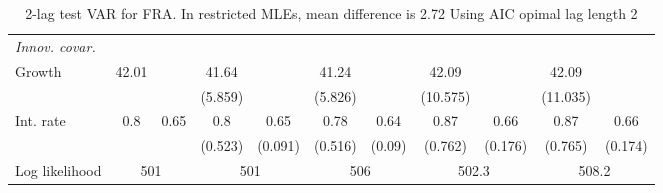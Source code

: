\begin{table}[htbp]
\begin{tabular}{@{\extracolsep{4pt}}lcccccccccc@{}}
\rule{0pt}{4ex} \emph{Innov. covar.}  	 & 	 & 	 & 	 & 	 & 	 & 	 & 	 & 	 & 	 &\\ 
\quad Growth 	 &42.01 	 &  	 & 41.64 	 &  	 & 41.24 	 &  	 & 42.09 	 &  	 & 42.09 	 & 	 \\ 
 		 &  	 &  	 & (5.859) 	 &  	 & (5.826) 	 &  	 & (10.575) 	 &  	 & (11.035) 	 &  	 \\ 
\quad Int. rate 	 &0.8 	 & 0.65 	 & 0.8 	 & 0.65 	 & 0.78 	 & 0.64 	 & 0.87 	 & 0.66 	 & 0.87 	 & 0.66	 \\ 
 		 &  	 &  	 & (0.523) 	 & (0.091) 	 & (0.516) 	 & (0.09) 	 & (0.762) 	 & (0.176) 	 & (0.765) 	 & (0.174) 	 \\ 
 \hline \rule{0pt}{4ex} 
  Log likelihood 	 &\multicolumn{2}{c}{501} 	 & \multicolumn{2}{c}{501} 	 & \multicolumn{2}{c}{506} 	 & \multicolumn{2}{c}{502.3} 	 & \multicolumn{2}{c}{508.2}\\ 

 \hline 	\end{tabular}		\caption{2-lag test VAR for FRA. In restricted MLEs, mean difference is 2.72 Using AIC opimal lag length 2}
		\label{tab:FRAopt_}

\end{table}